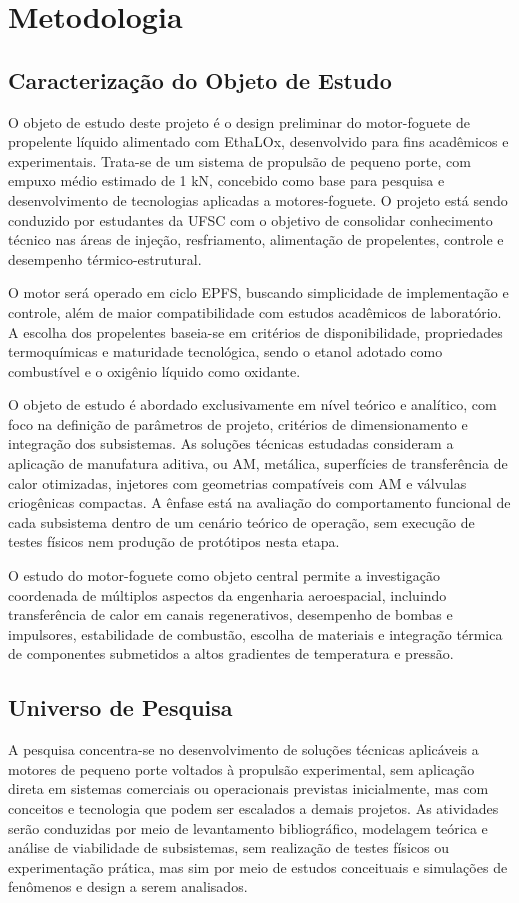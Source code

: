 \chapter{Metodologia}
\section{Caracterização do Objeto de Estudo}\label{sec:carac}
O objeto de estudo deste projeto é o design preliminar do motor-foguete de propelente líquido alimentado com \gls{EthaLOx}, desenvolvido para fins acadêmicos e experimentais. Trata-se de um sistema de propulsão de pequeno porte, com empuxo médio estimado de 1 kN, concebido como base para pesquisa e desenvolvimento de tecnologias aplicadas a motores-foguete. O projeto está sendo conduzido por estudantes da \Gls{UFSC} com o objetivo de consolidar conhecimento técnico nas áreas de injeção, resfriamento, alimentação de propelentes, controle e desempenho térmico-estrutural.

O motor será operado em ciclo \gls{EPFS}, buscando simplicidade de implementação e controle, além de maior compatibilidade com estudos acadêmicos de laboratório. A escolha dos propelentes baseia-se em critérios de disponibilidade, propriedades termoquímicas e maturidade tecnológica, sendo o etanol adotado como combustível e o oxigênio líquido como oxidante.

O objeto de estudo é abordado exclusivamente em nível teórico e analítico, com foco na definição de parâmetros de projeto, critérios de dimensionamento e integração dos subsistemas. As soluções técnicas estudadas consideram a aplicação de manufatura aditiva, ou \gls{AM}, metálica, superfícies de transferência de calor otimizadas, injetores com geometrias compatíveis com \gls{AM} e válvulas criogênicas compactas. A ênfase está na avaliação do comportamento funcional de cada subsistema dentro de um cenário teórico de operação, sem execução de testes físicos nem produção de protótipos nesta etapa.

O estudo do motor-foguete como objeto central permite a investigação coordenada de múltiplos aspectos da engenharia aeroespacial, incluindo transferência de calor em canais regenerativos, desempenho de bombas e impulsores, estabilidade de combustão, escolha de materiais e integração térmica de componentes submetidos a altos gradientes de temperatura e pressão.

\section{Universo de Pesquisa}\label{sec:univ}
A pesquisa concentra-se no desenvolvimento de soluções técnicas aplicáveis a motores de pequeno porte voltados à propulsão experimental, sem aplicação direta em sistemas comerciais ou operacionais previstas inicialmente, mas com conceitos e tecnologia que podem ser escalados a demais projetos. As atividades serão conduzidas por meio de levantamento bibliográfico, modelagem teórica e análise de viabilidade de subsistemas, sem realização de testes físicos ou experimentação prática, mas sim por meio de estudos conceituais e simulações de fenômenos e design a serem analisados.

